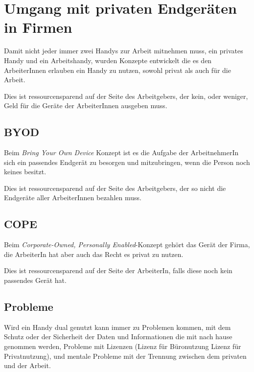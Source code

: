 \documentclass{article}
\begin{document}
\section{Umgang mit privaten Endgeräten in Firmen} 
Damit nicht jeder immer zwei Handys zur Arbeit mitnehmen muss, ein privates Handy und ein Arbeitshandy, wurden Konzepte entwickelt die es den ArbeiterInnen erlauben ein Handy zu nutzen, sowohl privat als auch für die Arbeit.

Dies ist ressourcensparend auf der Seite des Arbeitgebers, der kein, oder weniger, Geld für die Geräte der ArbeiterInnen ausgeben muss.

\subsection{BYOD}
Beim \emph{Bring Your Own Device} Konzept ist es die Aufgabe der ArbeitnehmerIn sich ein passendes Endgerät zu besorgen und mitzubringen, wenn die Person noch keines besitzt.

Dies ist ressourcensparend auf der Seite des Arbeitgebers, der so nicht die Endgeräte aller ArbeiterInnen bezahlen muss.

\subsection{COPE}
Beim \emph{Corporate-Owned, Personally Enabled}-Konzept gehört das Gerät der Firma, die ArbeiterIn hat aber auch das Recht es privat zu nutzen.

Dies ist ressourcensparend auf der Seite der ArbeiterIn, falls diese noch kein passendes Gerät hat.

\subsection{Probleme}
Wird ein Handy dual genutzt kann immer zu Problemen kommen, mit dem Schutz oder der Sicherheit der Daten und Informationen die mit nach hause genommen werden, Probleme mit Lizenzen (Lizenz für Büronutzung \vs Lizenz für Privatnutzung), und mentale Probleme mit der Trennung zwischen dem privaten und der Arbeit.
\end{document}
